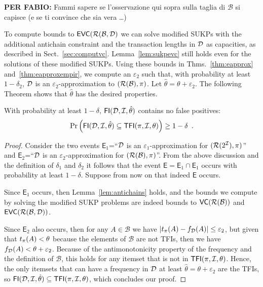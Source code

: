 {\bf PER FABIO:} Fammi sapere se l'osservazione qui sopra sulla taglia di
$\mathcal{B}$ si capisce (e se ti convince che sia vera \ldots)

To compute bounds to $\mathsf{EVC}(\mathcal{R}(\mathcal{B},{\cal D})$ we can solve modified SUKPs
with the additional antichain constraint and the transaction lengths in ${\cal D}$ as
capacities, as described in Sect.~\ref{sec:computvc}. Lemma~\ref{lem:sukpevc}
still holds even for the solutions of these modified SUKPs. Using these bounds
in Thms.~\ref{thm:eapprox} and~\ref{thm:eapproxempir}, we compute an
$\varepsilon_2$ such that, with probability at least $1-\delta_2$, ${\cal D}$ is an
$\varepsilon_2$-approximation to $(\mathcal{R}(\mathcal{B}),\pi)$. Let
$\hat{\theta}=\theta+\varepsilon_2$. The following Theorem shows that
$\hat{\theta}$ has the desired properties.

\begin{theorem}\label{lem:vcfull}
With probability at least $1-\delta$, $\mathsf{FI}({\cal D},{\cal I},\hat\theta)$ contains no
false positives:
\[
\Pr\left(\mathsf{FI}({\cal D},{\cal I},\hat\theta)\subseteq\mathsf{TFI}(\pi,{\cal I},\theta)\right)\ge 1-\delta\enspace.\]
\end{theorem}
\begin{proof}
  Consider the two events $\mathsf{E}_1$=``${\cal D}$ is an
  $\varepsilon_1$-approximation for $(\mathcal{R}(2^{\cal I}),\pi)$'' and
  $\mathsf{E}_2$=``${\cal D}$ is an $\varepsilon_2$-approximation for
  $(\mathcal{R}(\mathcal{B}),\pi)$''. From the above discussion and the definition
  of $\delta_1$ and $\delta_2$ it follows that the event
  $\mathsf{E}=\mathsf{E}_1\cap\mathsf{E}_1$ occurs with probability at least
  $1-\delta$. Suppose from now on that indeed $\mathsf{E}$ occurs.

  Since $\mathsf{E}_1$ occurs, then Lemma~\ref{lem:antichains} holds, and the
  bounds we compute by solving the modified SUKP problems are indeed bounds to
  $\mathsf{VC}(\mathcal{R}(\mathcal{B}))$ and $\mathsf{EVC}(\mathcal{R}(\mathcal{B},{\cal D}))$. 
  
  Since $\mathsf{E}_2$ also occurs, then for any $A\in\mathcal{B}$ we have
  $|t_\pi(A)-f_{\cal D}(A)|\le\varepsilon_2$, but given that $t_\pi(A)<\theta$
  because the elements of $\mathcal{B}$ are not TFIs, then we have
  $f_{\cal D}(A)<\theta+\varepsilon_2$. Because of the antimonotonicity property of
  the frequency and the definition of $\mathcal{B}$, this holds for any itemset
  that is not in $\mathsf{TFI}(\pi,{\cal I},\theta)$. Hence, the only itemsets that can
  have a frequency in ${\cal D}$ at least $\hat{\theta}=\theta+\varepsilon_2$ are the
  TFIs, so $\mathsf{FI}({\cal D},{\cal I},\hat{\theta})\subseteq\mathsf{TFI}(\pi,{\cal I},\theta)$, which
  concludes our proof.
\end{proof}

